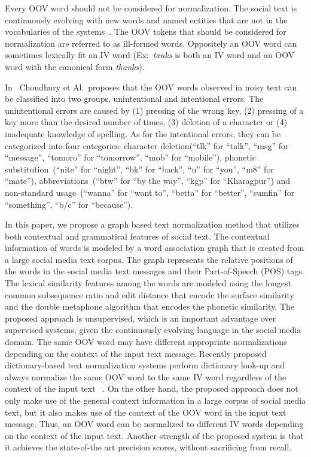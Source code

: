 \documentclass[preprint,review,12pt]{elsarticle}
\begin{document}
Every OOV word should not be considered for normalization. The social text is continuously evolving with new words and named entities that are not in the vocabularies of the systems~\cite{DBLP:conf/acl/HassanM13}. The OOV tokens that should be considered for normalization are referred to as ill-formed words. Oppositely an OOV word can sometimes lexically fit an IV word (Ex:~\textit{tanks} is both an IV word and an OOV word with the canonical form \textit{thanks}).

In~\cite{Choudhury:2007:IMS:1326044.1326048} Choudhury et Al.~proposes that the OOV words observed in noisy text can be classified into two groups, unintentional and intentional errors. The unintentional errors are caused by (1) pressing of the wrong key, (2) pressing of a key more than the desired number of times, (3) deletion of a character or (4) inadequate knowledge of spelling. As for the intentional errors, they can be categorized into four categories: character deletion(``tlk'' for ``talk'', ``msg'' for ``message'', ``tomoro'' for ``tomorrow'', ``mob'' for ``mobile''), phonetic substitution~(``nite'' for ``night'', ``bk'' for ``back'', ``u'' for ``you'', ``m8'' for ``mate''), abbreviations~(``btw'' for ``by the way'', ``kgp'' for ``Kharagpur'') and non-standard usage~(``wanna'' for ``want to'', ``betta'' for ``better'', ``sumfin'' for ``something'', ``b/c'' for ``because'').

In this paper, we propose a graph based text normalization method that utilizes both contextual and grammatical features of social text. The contextual information of words is modeled by a word association graph that is created from a large social media text corpus. The graph represents the relative positions of the words in the social media text messages and their Part-of-Speech (POS) tags. The lexical similarity features among the words are modeled using the longest common subsequence ratio and edit distance that encode the surface similarity and the double metaphone algorithm that encodes the phonetic similarity. The proposed approach is unsupervised, which is an important advantage over supervised systems, given the continuously evolving language in the social media domain. The same OOV word may have different appropriate normalizations depending on the context of the input text message. Recently proposed dictionary-based text normalization systems perform dictionary look-up and always normalize the same OOV word to the same IV word regardless of the context of the input text ~\cite{Han:2011:LNS:2002472.2002520,DBLP:conf/acl/HassanM13}. On the other hand, the proposed approach does not only make use of the general context information in a large corpus of social media text, but it also makes use of the context of the OOV word in the input text message. Thus, an OOV word can be normalized to different IV words depending on the context of the input text. Another strength of the proposed system is that it achieves the state-of-the art precision scores, without sacrificing from recall.
\end{document}

